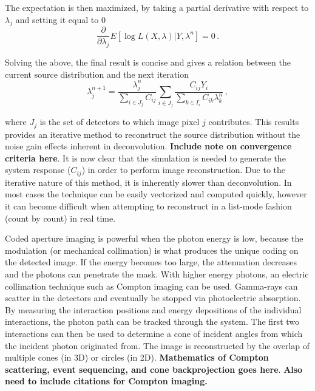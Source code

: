 \documentclass[10pt]{article}
\begin{document}
\noindent The expectation is then maximized, by taking a partial derivative with respect to $\lambda_j$ and setting it equal to 0
 \begin{equation}
	\frac{\partial}{\partial \lambda_j} E[\log L(X,\lambda) | Y,\lambda^n] = 0\,.
\end{equation}

\noindent Solving the above, the final result is concise and gives a relation between the current source distribution and the next iteration
%
 \begin{equation}
	\lambda_j^{n+1} = \frac{\lambda_j^n}{\sum\limits_{i \in J_j}C_{ij}} \sum_{i \in J_j} \frac{C_{ij}Y_i}{\sum\limits_{k \in I_i}C_{ik}\lambda_k^n}\,,
\end{equation}

\noindent where $J_j$ is the set of detectors to which image pixel $j$ contributes. This results provides an iterative method to reconstruct the source distribution without the noise gain effects inherent in deconvolution. \textbf{Include note on convergence criteria here}. It is now clear that the simulation is needed to generate the system response ($C_{ij}$) in order to perform image reconstruction. Due to the iterative nature of this method, it is inherently slower than deconvolution. In most cases the technique can be easily vectorized and computed quickly, however it can become difficult when attempting to reconstruct in a list-mode fashion (count by count) in real time.

Coded aperture imaging is powerful when the photon energy is low, because the modulation (or mechanical collimation) is what produces the unique coding on the detected image. If the energy becomes too large, the attenuation decreases and the photons can penetrate the mask. With higher energy photons, an electric collimation technique such as Compton imaging can be used. Gamma-rays can scatter in the detectors and eventually be stopped via photoelectric absorption. By measuring the interaction positions and energy depositions of the individual interactions, the photon path can be tracked through the system. The first two interactions can then be used to determine a cone of incident angles from which the incident photon originated from. The image is reconstructed by the overlap of multiple cones (in 3D) or circles (in 2D). \textbf{Mathematics of Compton scattering, event sequencing, and cone backprojection goes here}. \textbf{Also need to include citations for Compton imaging.}
\end{document}
